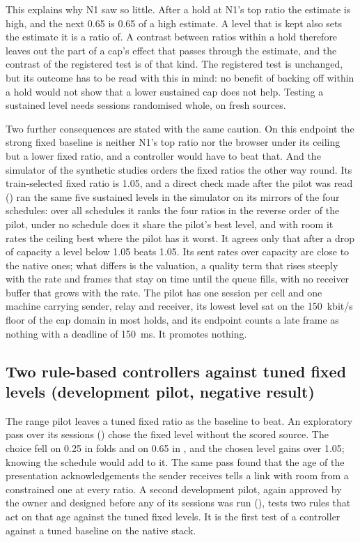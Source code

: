 This explains why N1 saw so little. After a hold at N1's top ratio the estimate is high, and the next 0.65 is 0.65 of a high estimate. A level that is kept also sets the estimate it is a ratio of. A contrast between ratios within a hold therefore leaves out the part of a cap's effect that passes through the estimate, and the contrast of the registered test is of that kind. The registered test is unchanged, but its outcome has to be read with this in mind: no benefit of backing off within a hold would not show that a lower sustained cap does not help. Testing a sustained level needs sessions randomised whole, on fresh sources.

Two further consequences are stated with the same caution. On this endpoint the strong fixed baseline is neither N1's top ratio nor the browser under its ceiling but a lower fixed ratio, and a controller would have to beat that. And the simulator of the synthetic studies orders the fixed ratios the other way round. Its train-selected fixed ratio is 1.05, and a direct check made after the pilot was read () ran the same five sustained levels in the simulator on its mirrors of the four schedules: over all schedules it ranks the four ratios in the reverse order of the pilot, under no schedule does it share the pilot's best level, and with room it rates the ceiling best where the pilot has it worst. It agrees only that after a drop of capacity a level below 1.05 beats 1.05. Its sent rates over capacity are close to the native ones; what differs is the valuation, a quality term that rises steeply with the rate and frames that stay on time until the queue fills, with no receiver buffer that grows with the rate. The pilot has one session per cell and one machine carrying sender, relay and receiver, its lowest level sat on the 150~kbit/s floor of the cap domain in most holds, and its endpoint counts a late frame as nothing with a deadline of 150~ms. It promotes nothing.
\fi

\ifdefined\LadderPilotSessions
\subsection{Two rule-based controllers against tuned fixed levels (development pilot, negative result)}
\label{sec:ladder-pilot}
The range pilot leaves a tuned fixed ratio as the baseline to beat. An exploratory pass over its sessions () chose the fixed level without the scored source. The choice fell on 0.25 in \LadderPilotFoldsQuarter{} folds and on 0.65 in \LadderPilotFoldsLow, and the chosen level gains \LadderPilotTunedGain{} \LadderPilotTunedGainT{} over 1.05; knowing the schedule would add \LadderPilotScheduleGain{} \LadderPilotScheduleGainT{} to it. The same pass found that the age of the presentation acknowledgements the sender receives tells a link with room from a constrained one at every ratio. A second development pilot, again approved by the owner and designed before any of its sessions was run (), tests two rules that act on that age against the tuned fixed levels. It is the first test of a controller against a tuned baseline on the native stack.

